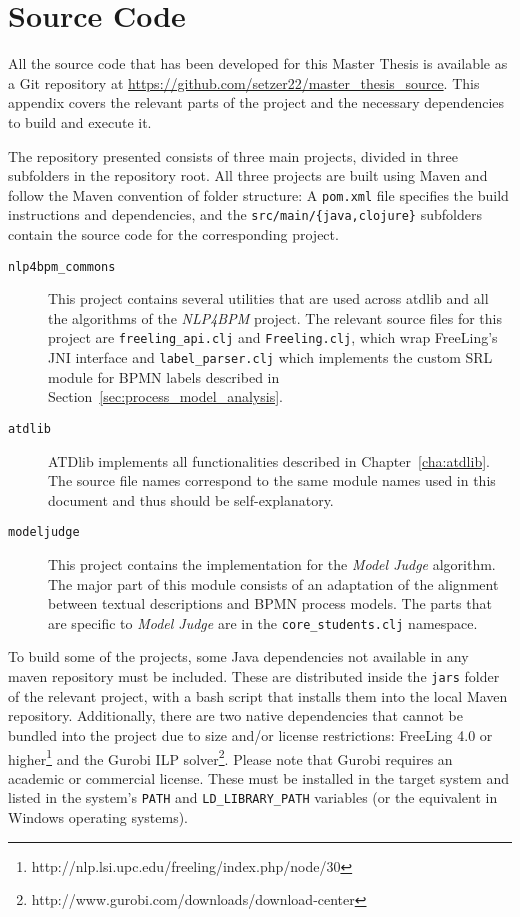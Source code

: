 \chapter{Source Code}

All the source code that has been developed for this Master Thesis is available
as a Git repository at \url{https://github.com/setzer22/master_thesis_source}.
This appendix covers the relevant parts of the project and the necessary
dependencies to build and execute it.

The repository presented consists of three main projects, divided in three
subfolders in the repository root. All three projects are built using Maven and
follow the Maven convention of folder structure: A \texttt{pom.xml} file
specifies the build instructions and dependencies, and the
\texttt{src/main/\{java,clojure\}} subfolders contain the source code for the
corresponding project.

\begin{description}
\item[\texttt{nlp4bpm\_commons}]{This project contains several utilities that
    are used across atdlib and all the algorithms of the \emph{NLP4BPM} project.
    The relevant source files for this project are \texttt{freeling\_api.clj} and
    \texttt{Freeling.clj}, which wrap FreeLing's JNI interface and
    \texttt{label\_parser.clj} which implements the custom SRL module for BPMN
    labels described in Section~\ref{sec:process_model_analysis}.}
\item[\texttt{atdlib}]{ATDlib implements all functionalities described in
    Chapter~\ref{cha:atdlib}. The source file names correspond to the same
    module names used in this document and thus should be self-explanatory.}
\item[\texttt{modeljudge}]{This project contains the implementation for the
    \emph{Model Judge} algorithm. The major part of this module consists of an
    adaptation of the alignment between textual descriptions and BPMN process
    models. The parts that are specific to \emph{Model Judge} are in the
    \texttt{core\_students.clj} namespace.}
\end{description}

To build some of the projects, some Java dependencies not available in any maven
repository must be included. These are distributed inside the \texttt{jars}
folder of the relevant project, with a bash script that installs them into the
local Maven repository. Additionally, there are two native dependencies that
cannot be bundled into the project due to size and/or license restrictions:
FreeLing 4.0 or
higher\footnote{http://nlp.lsi.upc.edu/freeling/index.php/node/30} and the
Gurobi ILP solver\footnote{http://www.gurobi.com/downloads/download-center}.
Please note that Gurobi requires an academic or commercial license. These must
be installed in the target system and listed in the system's \texttt{PATH} and
\texttt{LD\_LIBRARY\_PATH} variables (or the equivalent in Windows operating
systems).